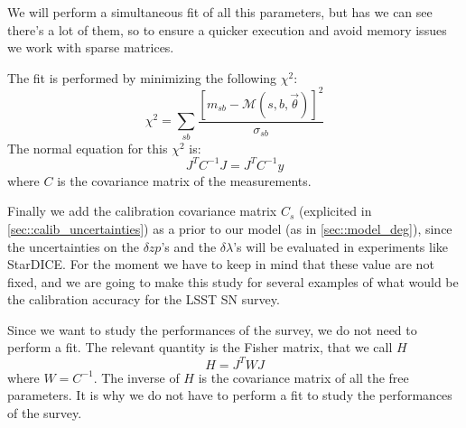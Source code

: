 \documentclass[\docopts]{\docclass}
\begin{document}
We will perform a simultaneous fit of all this parameters, but has we can see there's a lot of them, so to ensure a quicker execution and avoid memory issues we work with sparse matrices.

The fit is performed by minimizing the following $\chi^2$:
\begin{equation}
\chi^2 = \sum_{sb}\frac{[m_{sb} - \mathcal{M}(s, b, \vec\theta)]^2}{\sigma_{sb}}
\end{equation}
The normal equation for this $\chi^2$ is:
\begin{equation}
J^TC^{-1}J = J^TC^{-1}y
\end{equation}
where $C$ is the covariance matrix of the measurements.

Finally we add the calibration covariance matrix $C_s$ (explicited in \ref{sec::calib_uncertainties}) as a prior to our model (as in \ref{sec::model_deg}), since the uncertainties on the $\delta zp$'s and the $\delta \lambda$'s will be evaluated in experiments like StarDICE. For the moment we have to keep in mind that these value are not fixed, and we are going to make this study for several examples of what would be the calibration accuracy for the LSST SN survey.

Since we want to study the performances of the survey, we do not need to perform a fit.
The relevant quantity is the Fisher matrix, that we call $H$
\begin{equation}
H = J^TWJ
\end{equation}
where $W = C^{-1}$.
The inverse of $H$ is the covariance matrix of all the free parameters. It is why we do not have to perform a fit to study the performances of the survey.

\end{document}
